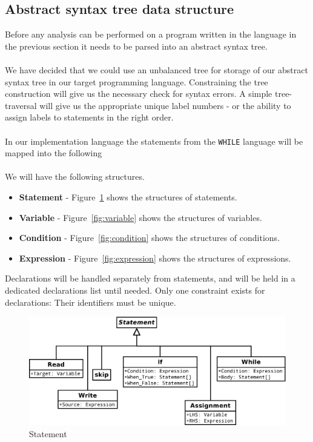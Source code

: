 \subsection{Abstract syntax tree data structure}\label{section:Abstractsyntaxtreedatastructure}
\label{sec:constructing_ast}
Before any analysis can be performed on a program written in the language in the previous section it needs to be parsed into an abstract syntax tree.\\\\
We have decided that we could use an unbalanced tree for storage of our abstract syntax tree in our target programming language. Constraining the tree construction will give us the necessary check for syntax errors.
A simple tree-traversal will give us the appropriate unique label numbers - or the ability to assign labels to statements in the right order.
\\
\\
In our implementation language the statements from the \texttt{WHILE} language will be mapped into the following  
\\\\
We will have the following structures.
\begin{itemize}
	\item \textbf{Statement} - Figure~\ref{fig:statement} shows the structures of statements.
	\item \textbf{Variable} - Figure~\ref{fig:variable} shows the structures of variables.
	\item \textbf{Condition} - Figure~\ref{fig:condition} shows the structures of conditions.
	\item \textbf{Expression} - Figure~\ref{fig:expression} shows the structures of expressions.
\end{itemize}
Declarations will be handled separately from statements, and will be held in a dedicated declarations list until needed. Only one constraint exists for declarations: Their identifiers must be unique.

\begin{figure}[h]
	\centering
	\includegraphics[scale=0.5]{../fig/Statement}
	\caption{Statement}
	\label{fig:statement}
\end{figure}

